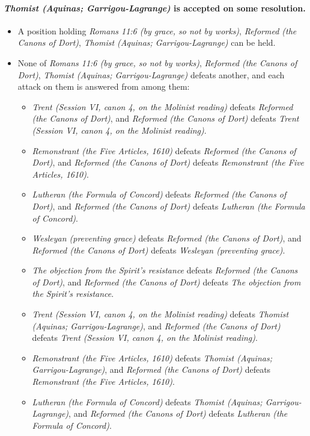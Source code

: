 \documentclass[11pt]{article}
\begin{document}
\paragraph{\emph{Thomist (Aquinas; Garrigou-Lagrange)} is accepted on some resolution.}
\begin{itemize}
\item A position holding \emph{Romans 11:6 (by grace, so not by works)}, \emph{Reformed (the Canons of Dort)}, \emph{Thomist (Aquinas; Garrigou-Lagrange)} can be held.
\item None of \emph{Romans 11:6 (by grace, so not by works)}, \emph{Reformed (the Canons of Dort)}, \emph{Thomist (Aquinas; Garrigou-Lagrange)} defeats another, and each attack on them is answered from among them:
\begin{itemize}
\item \emph{Trent (Session VI, canon 4, on the Molinist reading)} defeats \emph{Reformed (the Canons of Dort)}, and \emph{Reformed (the Canons of Dort)} defeats \emph{Trent (Session VI, canon 4, on the Molinist reading)}.
\item \emph{Remonstrant (the Five Articles, 1610)} defeats \emph{Reformed (the Canons of Dort)}, and \emph{Reformed (the Canons of Dort)} defeats \emph{Remonstrant (the Five Articles, 1610)}.
\item \emph{Lutheran (the Formula of Concord)} defeats \emph{Reformed (the Canons of Dort)}, and \emph{Reformed (the Canons of Dort)} defeats \emph{Lutheran (the Formula of Concord)}.
\item \emph{Wesleyan (preventing grace)} defeats \emph{Reformed (the Canons of Dort)}, and \emph{Reformed (the Canons of Dort)} defeats \emph{Wesleyan (preventing grace)}.
\item \emph{The objection from the Spirit’s resistance} defeats \emph{Reformed (the Canons of Dort)}, and \emph{Reformed (the Canons of Dort)} defeats \emph{The objection from the Spirit’s resistance}.
\item \emph{Trent (Session VI, canon 4, on the Molinist reading)} defeats \emph{Thomist (Aquinas; Garrigou-Lagrange)}, and \emph{Reformed (the Canons of Dort)} defeats \emph{Trent (Session VI, canon 4, on the Molinist reading)}.
\item \emph{Remonstrant (the Five Articles, 1610)} defeats \emph{Thomist (Aquinas; Garrigou-Lagrange)}, and \emph{Reformed (the Canons of Dort)} defeats \emph{Remonstrant (the Five Articles, 1610)}.
\item \emph{Lutheran (the Formula of Concord)} defeats \emph{Thomist (Aquinas; Garrigou-Lagrange)}, and \emph{Reformed (the Canons of Dort)} defeats \emph{Lutheran (the Formula of Concord)}.

\end{itemize}
\end{itemize}
\end{document}
